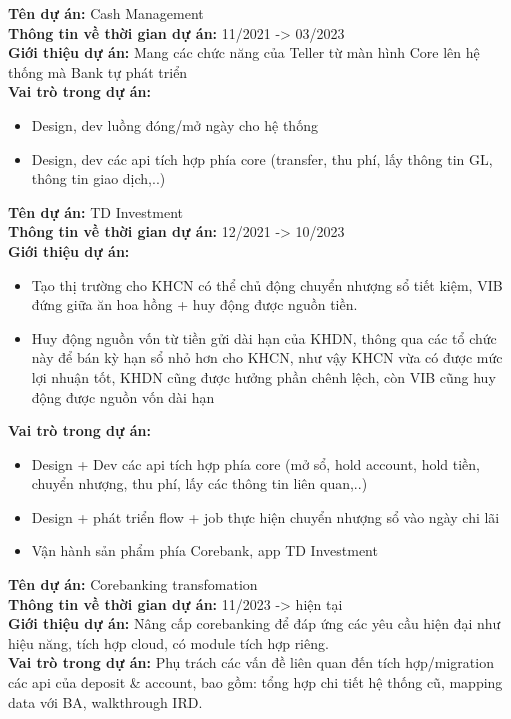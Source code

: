 \documentclass[11pt,a4paper,sans]{moderncv}
\begin{document}
\begin{mdframed}[style=ProjectFrame]
	\textbf{Tên dự án:} Cash Management \\
	\textbf{Thông tin về thời gian dự án:} 11/2021 -> 03/2023 \\
	\textbf{Giới thiệu dự án:}	Mang các chức năng của Teller từ màn hình Core lên hệ thống mà Bank tự phát triển\\
	\textbf{Vai trò trong dự án:}
	\begin{itemize}[leftmargin=0.6cm,noitemsep,topsep=0pt,label=-]
	\item Design, dev luồng đóng/mở ngày cho hệ thống
	\item Design, dev các api tích hợp phía core (transfer, thu phí, lấy thông tin GL, thông tin giao dịch,..)
	\end{itemize}
\end{mdframed}

\begin{mdframed}[style=ProjectFrame]
	\textbf{Tên dự án:} TD Investment \\
	\textbf{Thông tin về thời gian dự án:} 12/2021 -> 10/2023 \\
	\textbf{Giới thiệu dự án:} 
	\begin{itemize}[leftmargin=0.6cm,noitemsep,topsep=0pt,label=-]
		\item Tạo thị trường cho KHCN có thể chủ động chuyển nhượng sổ tiết kiệm, VIB đứng giữa ăn hoa hồng + huy động được nguồn tiền.
		\item Huy động nguồn vốn từ tiền gửi dài hạn của KHDN, thông qua các tổ chức này để bán kỳ hạn sổ nhỏ hơn cho KHCN, như vậy KHCN vừa có được mức lợi nhuận tốt, KHDN cũng được hưởng phần chênh lệch, còn VIB cũng huy động được nguồn vốn dài hạn
	\end{itemize}
	\textbf{Vai trò trong dự án:}
	\begin{itemize}[leftmargin=0.6cm,noitemsep,topsep=0pt,label=-]
		\item Design + Dev các api tích hợp phía core (mở sổ, hold account, hold tiền, chuyển nhượng, thu phí, lấy các thông tin liên quan,..)
		\item Design + phát triển flow + job thực hiện chuyển nhượng sổ vào ngày chi lãi
		\item Vận hành sản phẩm phía Corebank, app TD Investment
	\end{itemize}
\end{mdframed}

\begin{mdframed}[style=ProjectFrame]
	\textbf{Tên dự án:} Corebanking transfomation \\
	\textbf{Thông tin về thời gian dự án:} 11/2023 -> hiện tại \\
	\textbf{Giới thiệu dự án:} Nâng cấp corebanking để đáp ứng các yêu cầu hiện đại như hiệu năng, tích hợp cloud, có module tích hợp riêng.\\
	\textbf{Vai trò trong dự án:} Phụ trách các vấn đề liên quan đến tích hợp/migration các api của deposit \& account, bao gồm: tổng hợp chi tiết hệ thống cũ, mapping data với BA, walkthrough IRD.
\end{mdframed}
\end{document}
